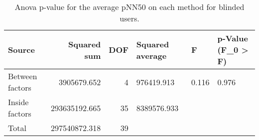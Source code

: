 
\begin{table}[!htb]
\centering
\caption{Anova p-value for the average pNN50 on each method for blinded users.}
\label{tab:anova_average_pnn50}
\begin{tabular}{lrrlll}
\toprule
         Source &   Squared sum &  DOF & Squared average &     F & p-Value (F\_0 > F) \\
\midrule
Between factors &   3905679.652 &    4 &      976419.913 & 0.116 &             0.976 \\
 Inside factors & 293635192.665 &   35 &     8389576.933 &       &                   \\
          Total & 297540872.318 &   39 &                 &       &                   \\
\bottomrule
\end{tabular}
\end{table}

